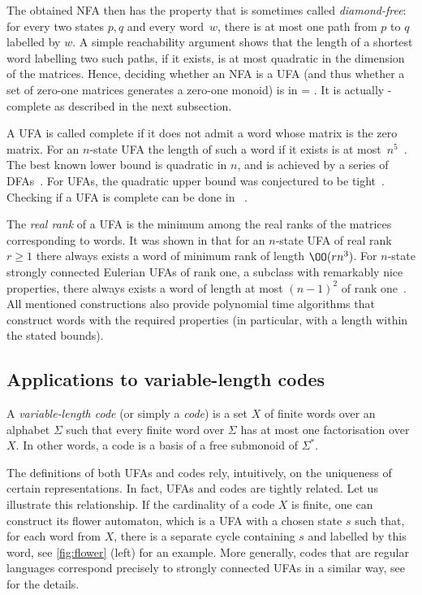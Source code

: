 The obtained NFA then has the property that is sometimes called \emph{diamond-free}: for every two states $p, q$ and every word~$w$, there is at most one path from $p$ to $q$ labelled by $w$. A simple reachability argument shows that the length of a shortest word labelling two such paths, if it exists, is at most quadratic in the dimension of the matrices. Hence, deciding whether an NFA is a UFA (and thus whether a set of zero-one matrices generates a zero-one monoid)  is in \coNL = \NL. It is actually \NL-complete as described in the next subsection.

A UFA is called complete if it does not admit a word whose matrix is the zero matrix. For an $n$-state UFA the length of such a word if it exists is at most~$n^5$~\cite{Kiefer2021}. 
The best known lower bound is quadratic in $n$, and is achieved by a series of DFAs~\cite{Rystsov1997}. 
For UFAs, the quadratic upper bound was conjectured to be tight~\cite[Conjecture 2]{Rystsov1992Rank}. Checking if a UFA is complete can be done in \NCT~\cite{Kiefer2021}. 

The \emph{real rank} of a UFA is the minimum among the real ranks of the matrices corresponding to words. It was shown in \cite{Carpi1988} that for an $n$-state UFA of real rank $r \ge 1$ there always exists a word of minimum rank of length $\OO(rn^3)$.
For $n$-state strongly connected Eulerian UFAs of rank one, a subclass with remarkably nice properties, there always exists a word of length at most $(n - 1)^2$ of rank one~\cite[Corollary~4]{Carpi2009}. All mentioned constructions also provide polynomial time algorithms that construct words with the required properties (in particular, with a length within the stated bounds).

\subsection{Applications to variable-length codes}\label{subs:var-length-codes}

A \emph{variable-length code} (or simply a \emph{code}) is a set $X$ of finite words over an alphabet $\Sigma$ such that every finite word over $\Sigma$ has at most one factorisation over $X$. In other words, a code is a basis of a free submonoid of $\Sigma^*$. 

The definitions of both UFAs and codes rely, intuitively, on the uniqueness of certain representations. In fact, UFAs and codes are tightly related. Let us illustrate this relationship.
If the cardinality of a code $X$ is finite, one can construct its flower automaton, which is a UFA with a chosen state $s$ such that, for each word from $X$, there is a separate cycle containing $s$ and labelled by this word, see \autoref{fig:flower} (left) for an example.
More generally, codes that are regular languages correspond precisely to strongly connected UFAs in a similar way, see \cite[Chapter 4]{Berstel2010} for the details.

